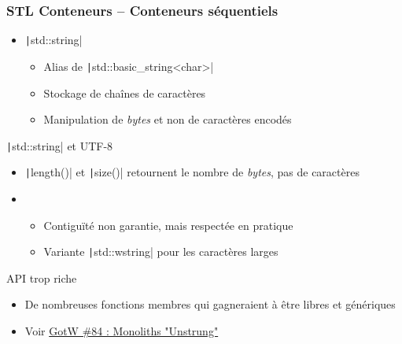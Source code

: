 \documentclass[C++.tex]{subfiles}
\begin{document}
\begin{frame}[fragile]
	\frametitle{STL Conteneurs -- Conteneurs séquentiels}
	\begin{itemize}
		\item \texttt|std::string|
		\begin{itemize}
			\item Alias de \texttt|std::basic_string<char>|
			\item Stockage de chaînes de caractères
			\item Manipulation de \textit{bytes} et non de caractères encodés
		\end{itemize}
	\end{itemize}

	\begin{alertblock}{\texttt|std::string| et UTF-8}
		\begin{itemize}
			\item \texttt|length()| et \texttt|size()| retournent le nombre de \textit{bytes}, pas de caractères
		\end{itemize}
	\end{alertblock}

	\begin{itemize}
		\item [] \begin{itemize}
			\item Contiguïté non garantie, mais respectée en pratique


			\item Variante \texttt|std::wstring| pour les caractères larges
		\end{itemize}
	\end{itemize}

	\begin{alertblock}{API trop riche}
		\begin{itemize}
			\item De nombreuses fonctions membres qui gagneraient à être libres et génériques
			\item Voir \href{http://www.gotw.ca/gotw/084.htm}{GotW \#84 : Monoliths "Unstrung"}
		\end{itemize}
	\end{alertblock}
\end{frame}
\end{document}

